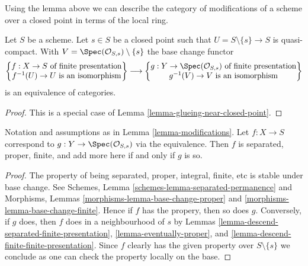 \noindent
Using the lemma above we can describe the category of modifications of
a scheme over a closed point in terms of the local ring.

\begin{lemma}
\label{lemma-modifications}
Let $S$ be a scheme. Let $s \in S$ be a closed point such that
$U = S \setminus \{s\} \to S$ is quasi-compact. With
$V = \Spec(\mathcal{O}_{S, s}) \setminus \{s\}$ the base change functor
$$
\left\{
\begin{matrix}
f : X \to S\text{ of finite presentation} \\
f^{-1}(U) \to U\text{ is an isomorphism}
\end{matrix}
\right\}
\longrightarrow
\left\{
\begin{matrix}
g : Y \to \Spec(\mathcal{O}_{S, s})\text{ of finite presentation} \\
g^{-1}(V) \to V\text{ is an isomorphism}
\end{matrix}
\right\}
$$
is an equivalence of categories.
\end{lemma}

\begin{proof}
This is a special case of Lemma \ref{lemma-glueing-near-closed-point}.
\end{proof}

\begin{lemma}
\label{lemma-modifications-properties}
Notation and assumptions as in Lemma \ref{lemma-modifications}.
Let $f : X \to S$ correspond to $g : Y \to \Spec(\mathcal{O}_{S, s})$
via the equivalence. Then $f$ is separated, proper, finite,
and add more here if and only if $g$ is so.
\end{lemma}

\begin{proof}
The property of being separated, proper, integral, finite, etc
is stable under base change. See
Schemes, Lemma \ref{schemes-lemma-separated-permanence}
and
Morphisms, Lemmas \ref{morphisms-lemma-base-change-proper} and
\ref{morphisms-lemma-base-change-finite}.
Hence if $f$ has the propery, then so does $g$.
Conversely, if $g$ does, then $f$ does in a neighbourhood of $s$ by
Lemmas \ref{lemma-descend-separated-finite-presentation},
\ref{lemma-eventually-proper}, and
\ref{lemma-descend-finite-finite-presentation}.
Since $f$ clearly has the given property over $S \setminus \{s\}$
we conclude as one can check the property locally on the base.
\end{proof}

